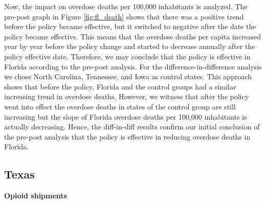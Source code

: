 \documentclass[12pt,letterpaper]{article}
\begin{document}
Now, the impact on overdose deaths per 100,000 inhabitants is analyzed. The pre-post graph in Figure \ref{fig:fl_death} shows that there was a positive trend before the policy became effective, but it switched to negative after the date the policy became effective. This means that the overdose deaths per capita increased year by year before the policy change and started to decrease annually after the policy effective date. Therefore, we may conclude that the policy is effective in Florida according to the pre-post analysis. For the difference-in-difference analysis we chose North Carolina, Tennessee, and Iowa as control states. This approach shows that before the policy, Florida and the control groups had a similar increasing trend in overdose deaths. However, we witness that after the policy went into effect the overdose deaths in states of the control group are still increasing but the slope of Florida overdose deaths per 100,000 inhabitants is actually decreasing. Hence, the diff-in-diff results confirm our initial conclusion of the pre-post analysis that the policy is effective in reducing overdose deaths in Florida.

\subsection{Texas}
\textbf{Opioid shipments}
\end{document}
